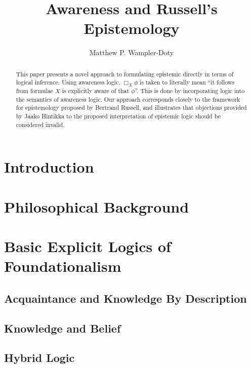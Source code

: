 \documentclass{article}
\begin{document}
\title{Awareness and Russell's Epistemology}\author{Matthew P.
Wampler-Doty}\date{}\maketitle

\begin{abstract}
This paper presents a novel approach to formulating epistemic directly
in terms of logical inference.  Using awareness logic, $\Box_X \phi$ is
taken to literally mean ``it follows from formulae $X$ is explicitly aware of
that $\phi$''.  This is done by incorporating logic into the semantics
of awareness logic.  Our approach corresponds closely to the framework
for epistemology proposed by Bertrand
Russell\cite{russell_problems_1936}, and illustrates that
objections provided by Jaako Hintikka\cite{hintikka_knowledge_1969} to
the proposed interpretation of epistemic logic should be considered invalid.
\end{abstract}

\listoftodos
\section{Introduction}
\label{intro}


\section{Philosophical Background}
\label{trad}


\section{Basic Explicit Logics of Foundationalism}

\subsection{Acquaintance and Knowledge By Description}
\label{awarenesslogic0}


\subsection{Knowledge and Belief}
\label{awarenesslogic}


\subsection{Hybrid Logic}
\label{hybrid_awareness}

\end{document}
